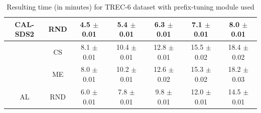 \begin{table}[htbp]
\begin{tabular*}{\linewidth}{c|c|@{\extracolsep{\fill}}ccccc}
\multirow{-3}{*}{\raggedright\arraybackslash CAL-SDS2} & RND & 4.5 $\pm$ {\small 0.01} & 5.4 $\pm$ {\small 0.01} & 6.3 $\pm$ {\small 0.01} & 7.1 $\pm$ {\small 0.01} & 8.0 $\pm$ {\small 0.01}\\
\midrule
 & CS & 8.1 $\pm$ {\small 0.01} & 10.4 $\pm$ {\small 0.01} & 12.8 $\pm$ {\small 0.01} & 15.5 $\pm$ {\small 0.02} & 18.4 $\pm$ {\small 0.02}\\

 & ME & 8.0 $\pm$ {\small 0.01} & 10.2 $\pm$ {\small 0.01} & 12.6 $\pm$ {\small 0.02} & 15.3 $\pm$ {\small 0.02} & 18.2 $\pm$ {\small 0.03}\\

\multirow{-3}{*}{\raggedright\arraybackslash AL} & RND & 6.0 $\pm$ {\small 0.01} & 7.8 $\pm$ {\small 0.01} & 9.8 $\pm$ {\small 0.01} & 12.0 $\pm$ {\small 0.01} & 14.5 $\pm$ {\small 0.01}\\
\bottomrule
\end{tabular*}
\caption{Resulting time (in minutes) for TREC-6 dataset with prefix-tuning module used}
\label{tab:time_full_trec_10_prefix}
\end{table}
